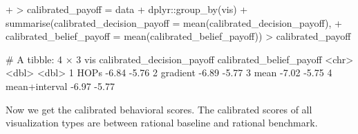 \documentclass{article}
\begin{document}
\begin{Schunk}
\begin{Sinput}
{+ }
> calibrated_payoff = data %>%
+   dplyr::group_by(vis) %>%
+   summarise(calibrated_decision_payoff = mean(calibrated_decision_payoff),
+             calibrated_belief_payoff = mean(calibrated_belief_payoff))
> calibrated_payoff
\end{Sinput}
\begin{Soutput}
# A tibble: 4 × 3
  vis           calibrated_decision_payoff calibrated_belief_payoff
  <chr>                              <dbl>                    <dbl>
1 HOPs                               -6.84                    -5.76
2 gradient                           -6.89                    -5.77
3 mean                               -7.02                    -5.75
4 mean+interval                      -6.97                    -5.77
\end{Soutput}
\end{Schunk}

Now we get the calibrated behavioral scores. The calibrated scores of all visualization types are between rational baseline and rational benchmark.
\end{document}
